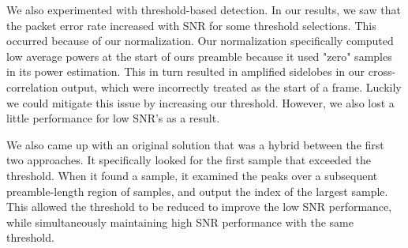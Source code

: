 \documentclass{article}
\begin{document}
We also experimented with threshold-based detection. In our results, we saw that the packet error rate increased with SNR for some threshold selections. This occurred because of our normalization. Our normalization specifically computed low average powers at the start of ours preamble because it used "zero" samples in its power estimation. This in turn resulted in amplified sidelobes in our cross-correlation output, which were incorrectly treated as the start of a frame. Luckily we could mitigate this issue by increasing our threshold. However, we also lost a little performance for low SNR's as a result.

We also came up with an original solution that was a hybrid between the first two approaches. It specifically looked for the first sample that exceeded the threshold. When it found a sample, it examined the peaks over a subsequent preamble-length region of samples, and output the index of the largest sample. This allowed the threshold to be reduced to improve the low SNR performance, while simultaneously maintaining high SNR performance with the same threshold.


{}
\end{document}
